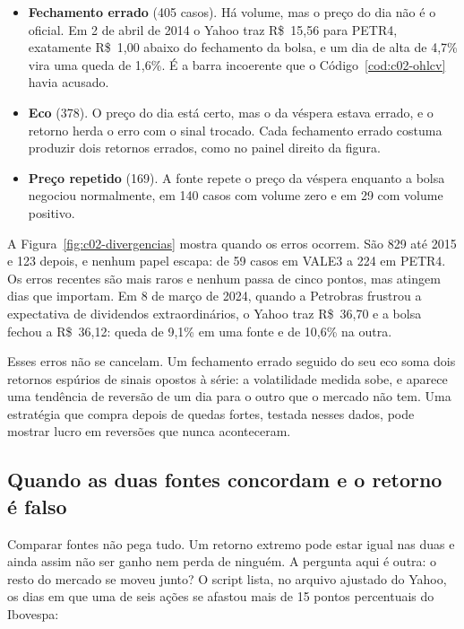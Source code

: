 \begin{itemize}
  \item \textbf{Fechamento errado} (405 casos). Há volume, mas o preço do dia não é o oficial. Em 2 de abril de 2014 o Yahoo traz R\$~15,56 para PETR4, exatamente R\$~1,00 abaixo do fechamento da bolsa, e um dia de alta de 4,7\% vira uma queda de 1,6\%. É a barra incoerente que o Código~\ref{cod:c02-ohlcv} havia acusado.
  \item \textbf{Eco} (378). O preço do dia está certo, mas o da véspera estava errado, e o retorno herda o erro com o sinal trocado. Cada fechamento errado costuma produzir dois retornos errados, como no painel direito da figura.
  \item \textbf{Preço repetido} (169). A fonte repete o preço da véspera enquanto a bolsa negociou normalmente, em 140 casos com volume zero e em 29 com volume positivo.
\end{itemize}


A Figura~\ref{fig:c02-divergencias} mostra quando os erros ocorrem. São 829 até 2015 e 123 depois, e nenhum papel escapa: de 59 casos em VALE3 a 224 em PETR4. Os erros recentes são mais raros e nenhum passa de cinco pontos, mas atingem dias que importam. Em 8 de março de 2024, quando a Petrobras frustrou a expectativa de dividendos extraordinários, o Yahoo traz R\$~36,70 e a bolsa fechou a R\$~36,12: queda de 9,1\% em uma fonte e de 10,6\% na outra.

Esses erros não se cancelam. Um fechamento errado seguido do seu eco soma dois retornos espúrios de sinais opostos à série: a volatilidade medida sobe, e aparece uma tendência de reversão de um dia para o outro que o mercado não tem. Uma estratégia que compra depois de quedas fortes, testada nesses dados, pode mostrar lucro em reversões que nunca aconteceram.

\subsection{Quando as duas fontes concordam e o retorno é falso}

Comparar fontes não pega tudo. Um retorno extremo pode estar igual nas duas e ainda assim não ser ganho nem perda de ninguém. A pergunta aqui é outra: o resto do mercado se moveu junto? O script  lista, no arquivo ajustado do Yahoo, os dias em que uma de seis ações se afastou mais de 15 pontos percentuais do Ibovespa:

